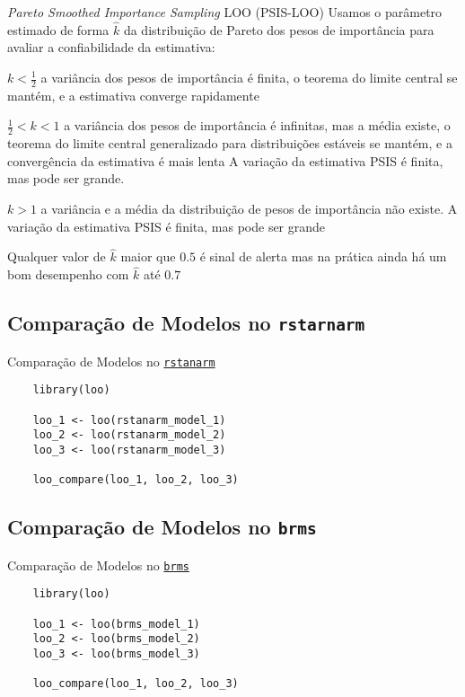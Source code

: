 \begin{frame}{\textit{Pareto Smoothed Importance Sampling} LOO (PSIS-LOO)}
	\small
	Usamos o parâmetro estimado de forma $\widehat{k}$ da distribuição de Pareto
	dos pesos de importância para avaliar a confiabilidade da estimativa:
	\begin{vfilleditems}
		\item \small $k < \frac{1}{2}$ a variância dos pesos de importância é finita,
		o teorema do limite central se mantém, e a estimativa converge rapidamente
		\item \small $\frac{1}{2} < k < 1$ a variância dos pesos de importância é infinitas,
		mas a média existe, o teorema do limite central generalizado
		para distribuições estáveis se mantém, e a convergência da estimativa é mais
		lenta
		A variação da estimativa PSIS é finita, mas pode ser grande.
		\item \small $k > 1$ a variância e a média da distribuição de pesos de importância não
		existe. A variação da estimativa PSIS é finita, mas pode ser grande
	\end{vfilleditems}
	\vfill
	\small
	Qualquer valor de $\widehat{k}$ maior que $0.5$ é sinal de alerta mas na prática
	ainda há um bom desempenho com $\widehat{k}$ até $0.7$
\end{frame}

\subsection{Comparação de Modelos no \texttt{rstarnarm}}
\begin{frame}[fragile]{Comparação de Modelos no \href{http://mc-stan.org/rstanarm/}{\texttt{rstanarm}}}
	\begin{lstlisting}
    library(loo)

    loo_1 <- loo(rstanarm_model_1)
    loo_2 <- loo(rstanarm_model_2)
    loo_3 <- loo(rstanarm_model_3)

    loo_compare(loo_1, loo_2, loo_3)
    \end{lstlisting}
\end{frame}

\subsection{Comparação de Modelos no \texttt{brms}}
\begin{frame}[fragile]{Comparação de Modelos no \href{https://paul-buerkner.github.io/brms/}{\texttt{brms}}}
	\begin{lstlisting}
    library(loo)

    loo_1 <- loo(brms_model_1)
    loo_2 <- loo(brms_model_2)
    loo_3 <- loo(brms_model_3)

    loo_compare(loo_1, loo_2, loo_3)
    \end{lstlisting}
\end{frame}
